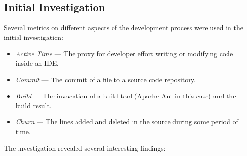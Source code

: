 %

\newpage





\subsection{Initial Investigation}  \label{EvaluationInCSDL:InitialInvestigation}

Several metrics on different aspects of the development process were used in the initial investigation: 
\begin{itemize}
	\item \textit{Active Time} --- The proxy for developer effort writing or modifying code inside an IDE.
	\item \textit{Commit} --- The commit of a file to a source code repository. 
	\item \textit{Build} --- The invocation of a build tool (Apache Ant in this case) and the build result.
	\item \textit{Churn} --- The lines added and deleted in the source during some period of time.
\end{itemize}


The investigation revealed several interesting findings:

